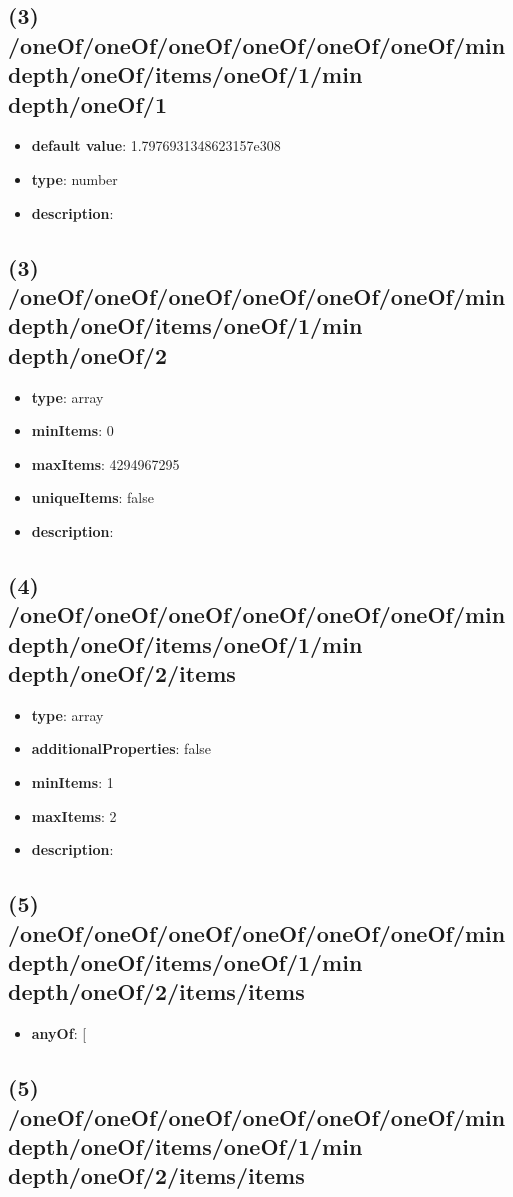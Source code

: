 \subsection{(3) /oneOf/oneOf/oneOf/oneOf/oneOf/oneOf/min depth/oneOf/items/oneOf/1/min depth/oneOf/1}
\begin{itemize}[leftmargin=3em]\item {\bf default value}: 1.7976931348623157e308
\item {\bf type}: number
\item {\bf description}: 
\end{itemize}\subsection{(3) /oneOf/oneOf/oneOf/oneOf/oneOf/oneOf/min depth/oneOf/items/oneOf/1/min depth/oneOf/2}
\begin{itemize}[leftmargin=3em]\item {\bf type}: array
\item {\bf minItems}: 0
\item {\bf maxItems}: 4294967295
\item {\bf uniqueItems}: false
\item {\bf description}: 
\end{itemize}\subsection{(4) /oneOf/oneOf/oneOf/oneOf/oneOf/oneOf/min depth/oneOf/items/oneOf/1/min depth/oneOf/2/items}
\begin{itemize}[leftmargin=4em]\item {\bf type}: array
\item {\bf additionalProperties}: false
\item {\bf minItems}: 1
\item {\bf maxItems}: 2
\item {\bf description}: 
\end{itemize}\subsection{(5) /oneOf/oneOf/oneOf/oneOf/oneOf/oneOf/min depth/oneOf/items/oneOf/1/min depth/oneOf/2/items/items}
\begin{itemize}[leftmargin=5em]\item {\bf anyOf}: [\end{itemize}\subsection{(5) /oneOf/oneOf/oneOf/oneOf/oneOf/oneOf/min depth/oneOf/items/oneOf/1/min depth/oneOf/2/items/items}
